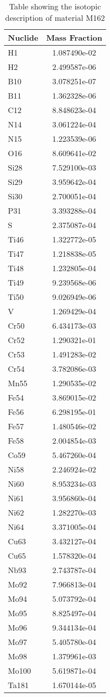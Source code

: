 \begin{centering}
\begin{table}[ht!]             
\begin{tabular}{l | c}
\hline
Nuclide & Mass Fraction\\
\hline
H1 & 1.087490e-02\\
H2 & 2.499587e-06\\
B10 & 3.078251e-07\\
B11 & 1.362328e-06\\
C12 & 8.848623e-04\\
N14 & 3.061224e-04\\
N15 & 1.223539e-06\\
O16 & 8.609641e-02\\
Si28 & 7.529100e-03\\
Si29 & 3.959642e-04\\
Si30 & 2.700051e-04\\
P31 & 3.393288e-04\\
S & 2.375087e-04\\
Ti46 & 1.322772e-05\\
Ti47 & 1.218838e-05\\
Ti48 & 1.232805e-04\\
Ti49 & 9.239568e-06\\
Ti50 & 9.026949e-06\\
V & 1.269429e-04\\
Cr50 & 6.434173e-03\\
Cr52 & 1.290321e-01\\
Cr53 & 1.491283e-02\\
Cr54 & 3.782086e-03\\
Mn55 & 1.290535e-02\\
Fe54 & 3.869015e-02\\
Fe56 & 6.298195e-01\\
Fe57 & 1.480546e-02\\
Fe58 & 2.004854e-03\\
Co59 & 5.467260e-04\\
Ni58 & 2.246924e-02\\
Ni60 & 8.953234e-03\\
Ni61 & 3.956860e-04\\
Ni62 & 1.282270e-03\\
Ni64 & 3.371005e-04\\
Cu63 & 3.432127e-04\\
Cu65 & 1.578320e-04\\
Nb93 & 2.743787e-04\\
Mo92 & 7.966813e-04\\
Mo94 & 5.073792e-04\\
Mo95 & 8.825497e-04\\
Mo96 & 9.344134e-04\\
Mo97 & 5.405780e-04\\
Mo98 & 1.379961e-03\\
Mo100 & 5.619871e-04\\
Ta181 & 1.670144e-05
\end{tabular}
\caption{Table showing the isotopic description of material M162}
\label{table:material_M162}
\end{table}\clearpage                          

\end{centering}
